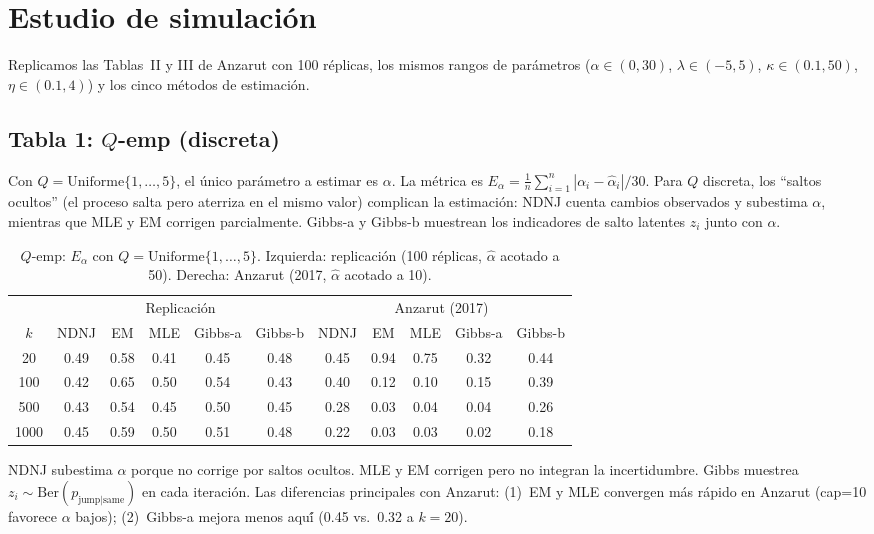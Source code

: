 \documentclass[12pt,letterpaper]{article}
\begin{document}
\section{Estudio de simulaci\'{o}n}

Replicamos las Tablas~II y III de Anzarut con 100 r\'{e}plicas, los mismos rangos de par\'{a}metros ($\alpha \in (0,30)$, $\lambda \in (-5,5)$, $\kappa \in (0.1,50)$, $\eta \in (0.1,4)$) y los cinco m\'{e}todos de estimaci\'{o}n.

\subsection{Tabla 1: $Q$-emp (discreta)}

Con $Q = \text{Uniforme}\{1, \ldots, 5\}$, el \'{u}nico par\'{a}metro a estimar es $\alpha$. La m\'{e}trica es $E_\alpha = \frac{1}{n} \sum_{i=1}^{n} |\alpha_i - \hat{\alpha}_i| / 30$.
Para $Q$ discreta, los ``saltos ocultos'' (el proceso salta pero aterriza en el mismo valor) complican la estimaci\'{o}n: NDNJ cuenta cambios observados y subestima $\alpha$, mientras que MLE y EM corrigen parcialmente.
Gibbs-a y Gibbs-b muestrean los indicadores de salto latentes $z_i$ junto con $\alpha$.

\begin{table}[h]
\centering
\caption{$Q$-emp: $E_\alpha$ con $Q = \text{Uniforme}\{1,\ldots,5\}$. Izquierda: replicaci\'{o}n (100 r\'{e}plicas, $\hat{\alpha}$ acotado a 50). Derecha: Anzarut (2017, $\hat{\alpha}$ acotado a 10).}
\label{tab:sim-qemp}
\begin{tabular}{c|ccccc|ccccc}
\toprule
& \multicolumn{5}{c|}{Replicaci\'{o}n} & \multicolumn{5}{c}{Anzarut (2017)} \\
\cmidrule(lr){2-6} \cmidrule(lr){7-11}
$k$ & NDNJ & EM & MLE & Gibbs-a & Gibbs-b & NDNJ & EM & MLE & Gibbs-a & Gibbs-b \\
\midrule
20 & 0.49 & 0.58 & 0.41 & 0.45 & 0.48 & 0.45 & 0.94 & 0.75 & 0.32 & 0.44 \\
100 & 0.42 & 0.65 & 0.50 & 0.54 & 0.43 & 0.40 & 0.12 & 0.10 & 0.15 & 0.39 \\
500 & 0.43 & 0.54 & 0.45 & 0.50 & 0.45 & 0.28 & 0.03 & 0.04 & 0.04 & 0.26 \\
1000 & 0.45 & 0.59 & 0.50 & 0.51 & 0.48 & 0.22 & 0.03 & 0.03 & 0.02 & 0.18 \\
\bottomrule
\end{tabular}
\begin{flushleft}\small
NDNJ subestima $\alpha$ porque no corrige por saltos ocultos. MLE y EM corrigen pero no integran la incertidumbre. Gibbs muestrea $z_i \sim \text{Ber}(p_{\text{jump}|\text{same}})$ en cada iteraci\'{o}n. Las diferencias principales con Anzarut: (1)~EM y MLE convergen m\'{a}s r\'{a}pido en Anzarut (cap=10 favorece $\alpha$ bajos); (2)~Gibbs-a mejora menos aqu\'{\'i} (0.45 vs.\ 0.32 a $k=20$).
\end{flushleft}
\end{table}
\end{document}

